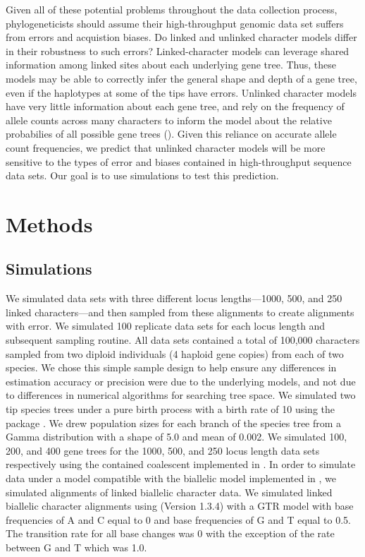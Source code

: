 Given all of these potential problems throughout the data collection process,
phylogeneticists should assume their high-throughput genomic data set suffers
from errors and acquistion biases.
Do linked and unlinked character models differ in their robustness to such
errors?
Linked-character models can leverage shared information among linked sites
about each underlying gene tree.
Thus, these models may be able to correctly infer the general shape and depth
of a gene tree, even if the haplotypes at some of the tips have errors.
Unlinked character models have very little information about each gene tree,
and rely on the frequency of allele counts across many characters to inform the
model about the relative probabilies of all possible gene trees
().
Given this reliance on accurate allele count frequencies, we predict
that unlinked character models will be more sensitive to the types of error
and biases contained in high-throughput sequence data sets.
Our goal is to use simulations to test this prediction.



\section{Methods}
\subsection{Simulations}
We simulated data sets with three different locus lengths—1000, 500, and 250 
linked characters—and then sampled from these alignments to create alignments 
with  error. We simulated 100 replicate data sets for each locus length and 
subsequent sampling routine. All data sets contained a total of 100,000 
characters sampled from two diploid individuals (4 haploid gene copies) from each 
of two species. We chose this simple sample design to help ensure any 
differences in estimation accuracy or precision were due to the underlying 
models, and not due to differences in numerical algorithms for searching tree 
space.  We simulated two tip species trees under a pure birth process with a 
birth rate of 10 using the \python package
\dendropy
\citep[Version 4.40; dev branch commit eb69003;][]{Dendropy}.  
We drew population sizes for each branch of the species tree from a Gamma 
distribution with a shape of 5.0 and mean of 0.002. We simulated 100, 200, and 
400 gene trees for the 1000, 500, and 250 locus length data sets respectively 
using the contained coalescent implemented in \dendropy. In order to 
simulate data under a model compatible with the biallelic model implemented in 
\ecoevolity, we simulated alignments of linked biallelic character data. 
We simulated linked biallelic character alignments using
\seqgen (Version 1.3.4)
\citep{@rambautSeqGenApplicationMonte1997}
with a GTR model with base frequencies of A and C equal to 0 and base 
frequencies of G and T equal to 0.5. The transition rate for all base changes was 
0 with the exception of the rate between G and T which was 1.0. 


